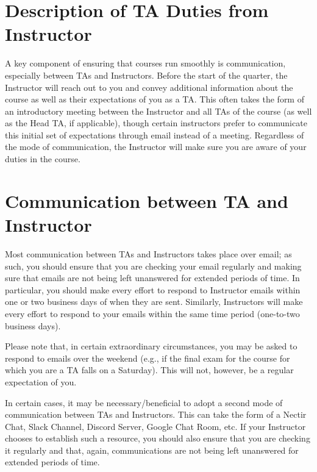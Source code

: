 \documentclass[
  letterpaper,
  DIV=11,
  numbers=noendperiod]{scrreprt}
\begin{document}
\hypertarget{description-of-ta-duties-from-instructor}{%
\section{Description of TA Duties from
Instructor}\label{description-of-ta-duties-from-instructor}}

A key component of ensuring that courses run smoothly is communication,
especially between TAs and Instructors. Before the start of the quarter,
the Instructor will reach out to you and convey additional information
about the course as well as their expectations of you as a TA. This
often takes the form of an introductory meeting between the Instructor
and all TAs of the course (as well as the Head TA, if applicable),
though certain instructors prefer to communicate this initial set of
expectations through email instead of a meeting. Regardless of the mode
of communication, the Instructor will make sure you are aware of your
duties in the course.

\hypertarget{communication-between-ta-and-instructor}{%
\section{Communication between TA and
Instructor}\label{communication-between-ta-and-instructor}}

Most communication between TAs and Instructors takes place over email;
as such, you should ensure that you are checking your email regularly
and making sure that emails are not being left unanswered for extended
periods of time. In particular, you should make every effort to respond
to Instructor emails within one or two business days of when they are
sent. Similarly, Instructors will make every effort to respond to your
emails within the same time period (one-to-two business days).

Please note that, in certain extraordinary circumstances, you may be
asked to respond to emails over the weekend (e.g., if the final exam for
the course for which you are a TA falls on a Saturday). This will not,
however, be a regular expectation of you.

In certain cases, it may be necessary/beneficial to adopt a second mode
of communication between TAs and Instructors. This can take the form of
a Nectir Chat, Slack Channel, Discord Server, Google Chat Room, etc. If
your Instructor chooses to establish such a resource, you should also
ensure that you are checking it regularly and that, again,
communications are not being left unanswered for extended periods of
time.
\end{document}
